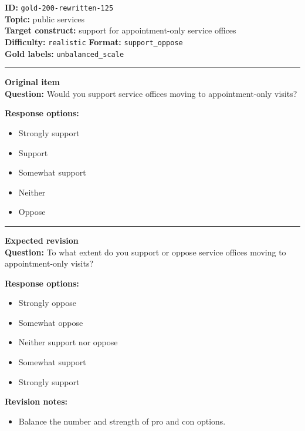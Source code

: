 \documentclass[10pt,a4paper]{article}
\newcommand{\sectionline}{\vspace{0.15em}\hrule\vspace{0.35em}}
\begin{document}
\begin{tcolorbox}[colframe=FlawRed,colback=white,colbacktitle=FlawRed!9,coltitle=black,title={Item 125\hfill Flawed item}]
\textbf{ID:} \texttt{gold-200-rewritten-125}\\
\textbf{Topic:} public services\\
\textbf{Target construct:} support for appointment-only service offices\\
\textbf{Difficulty:} \texttt{realistic} \quad \textbf{Format:} \texttt{support\_oppose}\\
\textbf{Gold labels:} \texttt{unbalanced\_scale}\\
\sectionline
\textbf{Original item}\\
\textbf{Question:} Would you support service offices moving to appointment-only visits?
\par\textbf{Response options:}
\begin{itemize}
\item Strongly support
\item Support
\item Somewhat support
\item Neither
\item Oppose
\end{itemize}
\sectionline
\textbf{Expected revision}\\
\textbf{Question:} To what extent do you support or oppose service offices moving to appointment-only visits?
\par\textbf{Response options:}
\begin{itemize}
\item Strongly oppose
\item Somewhat oppose
\item Neither support nor oppose
\item Somewhat support
\item Strongly support
\end{itemize}
\par\textbf{Revision notes:}
\begin{itemize}
\item Balance the number and strength of pro and con options.
\end{itemize}
\end{tcolorbox}
\end{document}
